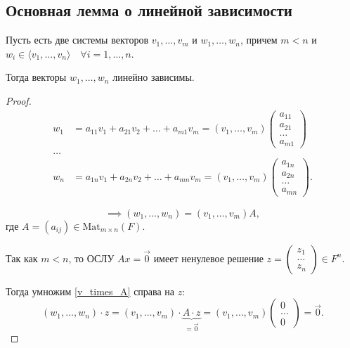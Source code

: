 \subsection{Основная лемма о линейной зависимости}

\begin{lemma}
    Пусть есть две системы векторов $v_1, \dots, v_m$ и $w_1, \dots, w_n$, причем $m < n$ и $w_i \in \langle v_1, \dots, v_n \rangle \quad \forall i = 1, \dots, n$.

    Тогда векторы $w_1, \dots, w_n$ линейно зависимы.
\end{lemma}

\begin{proof}
    \begin{align*}
        w_1 &= a_{11} v_1 + a_{21} v_2 + \dots + a_{m1} v_m = (v_1, \dots, v_m) \begin{pmatrix} a_{11} \\ a_{21} \\ \dots \\ a_{m1} \end{pmatrix} \\
        \dots\\
        w_n &= a_{1n} v_1 + a_{2n} v_2 + \dots + a_{mn} v_m = (v_1, \dots, v_m) \begin{pmatrix} a_{1n} \\ a_{2n} \\ \dots \\ a_{mn} \end{pmatrix}
    .\end{align*}

    \begin{equation*}
        \tag{$\star$}
        \label{v_times_A}
        \implies (w_1, \dots, w_n) = (v_1, \dots, v_m) A
    ,\end{equation*}
    где $A = (a_{ij}) \in \text{Mat}_{m \times n} (F)$.

    Так как $m < n$, то ОСЛУ $Ax = \overrightarrow{0}$ имеет ненулевое решение $z = \begin{pmatrix} z_1 \\ \dots \\ z_n \end{pmatrix} \in F^n$.

    Тогда умножим \eqref{v_times_A} справа на $z$:
    \begin{equation*}
        (w_1, \dots, w_n) \cdot z = (v_1, \dots, v_m) \cdot \underbrace{A \cdot z}_{= \overrightarrow{0}} = (v_1, \dots, v_m) \begin{pmatrix} 0 \\ \dots \\ 0 \end{pmatrix} = \overrightarrow{0}
    .\end{equation*}


\end{proof}
